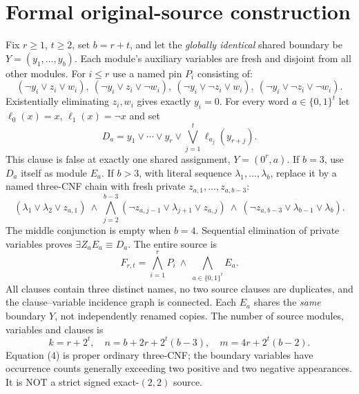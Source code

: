 \documentclass[11pt]{article}
\begin{document}
\section{Formal original-source construction}
Fix $r\ge1$, $t\ge2$, set $b=r+t$, and let the
\emph{globally identical} shared boundary be
$Y=(y_1,\ldots,y_b)$. Each module's auxiliary variables
are fresh and disjoint from all other modules.
For $i\le r$ use a named pin $P_i$ consisting of:
\[
(\neg y_i\lor z_i\lor w_i),\
(\neg y_i\lor z_i\lor\neg w_i),\
(\neg y_i\lor\neg z_i\lor w_i),\
(\neg y_i\lor\neg z_i\lor\neg w_i).       \tag{1}
\]
Existentially eliminating $z_i,w_i$ gives exactly
$y_i=0$. For every word $a\in\{0,1\}^t$ let
$\ell_0(x)=x$, $\ell_1(x)=\neg x$ and set
\[
D_a=y_1\lor\cdots\lor y_r\lor
\bigvee_{j=1}^{t}\ell_{a_j}(y_{r+j}).             \tag{2}
\]
This clause is false at exactly one shared assignment,
$Y=(0^r,a)$. If $b=3$, use $D_a$ itself as
module $E_a$. If $b>3$, with literal sequence
$\lambda_1,\ldots,\lambda_b$, replace it by
a named three-CNF chain with fresh private
$z_{a,1},\ldots,z_{a,b-3}$:
\[
(\lambda_1\lor\lambda_2\lor z_{a,1})
\ \land\
\bigwedge_{j=2}^{b-3}
(\neg z_{a,j-1}\lor\lambda_{j+1}\lor z_{a,j})
\ \land\
(\neg z_{a,b-3}\lor\lambda_{b-1}\lor\lambda_b).
\tag{3}
\]
The middle conjunction is empty when $b=4$.
Sequential elimination of private variables proves
$\exists Z_a E_a\equiv D_a$.
The entire source is
\[
F_{r,t}=\bigwedge_{i=1}^r P_i
\ \land\ \bigwedge_{a\in\{0,1\}^t}E_a.            \tag{4}
\]
All clauses contain three distinct names, no two source
clauses are duplicates, and the clause--variable incidence
graph is connected. Each $E_a$ shares the \emph{same}
boundary $Y$, not independently renamed copies.
The number of source modules, variables and clauses is
\[
k=r+2^t,\quad
n=b+2r+2^t(b-3),\quad
m=4r+2^t(b-2).                                   \tag{5}
\]
Equation (4) is proper ordinary three-CNF; the boundary
variables have occurrence counts generally exceeding
two positive and two negative appearances. It is NOT
a strict signed exact-$(2,2)$ source.
\end{document}
